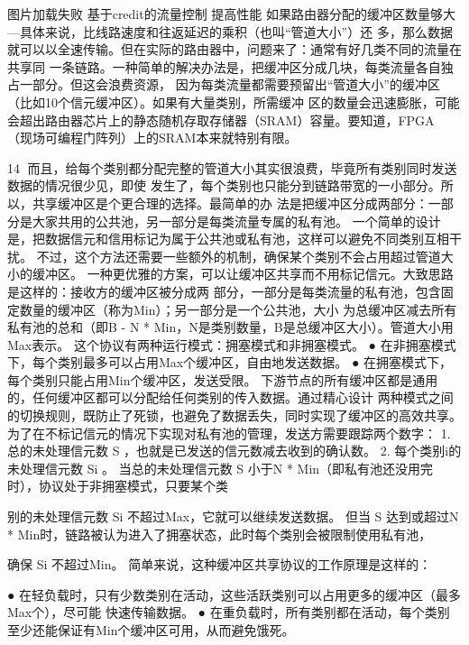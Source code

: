        图片加载失败
                   基于credit的流量控制
提高性能
如果路由器分配的缓冲区数量够大—具体来说，比线路速度和往返延迟的乘积（也叫“管道大小”）还
多，那么数据就可以以全速传输。但在实际的路由器中，问题来了：通常有好几类不同的流量在共享同
一条链路。一种简单的解决办法是，把缓冲区分成几块，每类流量各自独占一部分。但这会浪费资源，
因为每类流量都需要预留出“管道大小”的缓冲区（比如10个信元缓冲区）。如果有大量类别，所需缓冲
区的数量会迅速膨胀，可能会超出路由器芯片上的静态随机存取存储器（SRAM）容量。要知道，FPGA
（现场可编程门阵列）上的SRAM本来就特别有限。

                                               14
而且，给每个类别都分配完整的管道大小其实很浪费，毕竟所有类别同时发送数据的情况很少见，即使
发生了，每个类别也只能分到链路带宽的一小部分。所以，共享缓冲区是个更合理的选择。最简单的办
法是把缓冲区分成两部分：一部分是大家共用的公共池，另一部分是每类流量专属的私有池。
一个简单的设计是，把数据信元和信用标记为属于公共池或私有池，这样可以避免不同类别互相干扰。
不过，这个方法还需要一些额外的机制，确保某个类别不会占用超过管道大小的缓冲区。
一种更优雅的方案，可以让缓冲区共享而不用标记信元。大致思路是这样的：接收方的缓冲区被分成两
部分，一部分是每类流量的私有池，包含固定数量的缓冲区（称为Min）；另一部分是一个公共池，大小
为总缓冲区减去所有私有池的总和（即B - N * Min，N是类别数量，B是总缓冲区大小）。管道大小用
Max表示。
这个协议有两种运行模式：拥塞模式和非拥塞模式。
 ● 在非拥塞模式下，每个类别最多可以占用Max个缓冲区，自由地发送数据。
 ● 在拥塞模式下，每个类别只能占用Min个缓冲区，发送受限。
    下游节点的所有缓冲区都是通用的，任何缓冲区都可以分配给任何类别的传入数据。通过精心设计
    两种模式之间的切换规则，既防止了死锁，也避免了数据丢失，同时实现了缓冲区的高效共享。
为了在不标记信元的情况下实现对私有池的管理，发送方需要跟踪两个数字：
 1. 总的未处理信元数 S ，也就是已发送的信元数减去收到的确认数。
 2. 每个类别i的未处理信元数 Si 。
    当总的未处理信元数 S 小于N * Min（即私有池还没用完时），协议处于非拥塞模式，只要某个类
                 ​




    别的未处理信元数 Si 不超过Max，它就可以继续发送数据。
    但当 S 达到或超过N * Min时，链路被认为进入了拥塞状态，此时每个类别会被限制使用私有池，
             ​




    确保 Si 不超过Min。
    简单来说，这种缓冲区共享协议的工作原理是这样的：
        ​




 ● 在轻负载时，只有少数类别在活动，这些活跃类别可以占用更多的缓冲区（最多Max个），尽可能
    快速传输数据。
 ● 在重负载时，所有类别都在活动，每个类别至少还能保证有Min个缓冲区可用，从而避免饿死。

